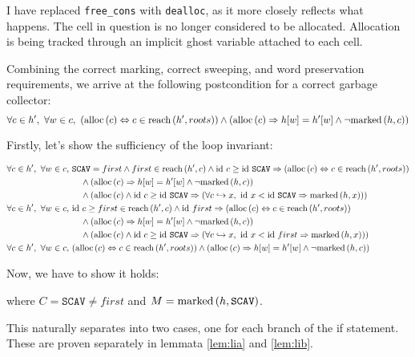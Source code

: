 I have replaced \texttt{free\_cons} with \texttt{dealloc}, as it more
closely reflects what happens. The \gls{cell} in question is no longer
considered to be allocated. Allocation is being tracked through an
implicit ghost variable attached to each cell.

Combining the correct marking, correct sweeping, and word preservation
requirements, we arrive at the following postcondition for a correct
\gls{garbage collector}: \[\forall c \in h',\ \forall w \in c,\
(\mathrm{alloc}\left(c\right) \Leftrightarrow c \in \mathrm{reach}\left(h', roots\right)) \land (\mathrm{alloc}\left(c\right) \Rightarrow
h[w] = h'[w] \land \lnot\mathrm{marked}\left(h, c\right))\]


\begin{lemma}
  Firstly, let's show the sufficiency of the loop invariant:

  \begin{align*}
    \forall c \in h',\ \forall w \in c,\ 
    &\mathtt{SCAV} = first \land first \in \reach{h'}{c} \land
    \id~c \geq \id~\mathtt{SCAV} \implies (\alloc{c} \iff c \in
    \reach{h'}{roots})\\
    &\quad\land (\alloc{c} \implies h[w] = h'[w] \land \lnot
    \marked{h}{c})\\
    &\quad\land (\alloc{c} \land \id~c \geq \id~\mathtt{SCAV} \implies
    (\forall c \pointsto x,\ \id~x < \id~\mathtt{SCAV} \implies
    \marked{h}{x}))\\
%
    \forall c \in h',\ \forall w \in c,\ 
    &\id~c \geq first \in \reach{h'}{c} \land \id~first
    \implies (\alloc{c} \iff c \in \reach{h'}{roots})\\
    &\quad\land (\alloc{c} \implies h[w] = h'[w] \land \lnot
    \marked{h}{c})\\
    &\quad\land (\alloc{c} \land \id~c \geq \id~\mathtt{SCAV} \implies
    (\forall c \pointsto x,\ \id~x < \id~first \implies
    \marked{h}{x}))\\
%
    \forall c \in h',\ \forall w \in c,\ 
    &(\alloc{c} \iff c \in \reach{h'}{roots}) \land (\alloc{c}
    \implies h[w] = h'[w] \land \lnot \marked{h}{c})
  \end{align*}

  Now, we have to show it holds:

  \begin{prooftree}
  \end{prooftree}

  where $C = \mathtt{SCAV} \neq first$ and $M =
  \mathrm{marked}\left(h, \mathtt{SCAV}\right)$.

  This naturally separates into two cases, one for each branch of the
  if statement. These are proven separately in lemmata \ref{lem:lia}
  and \ref{lem:lib}.
  \label{lem:li}
\end{lemma}

